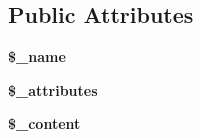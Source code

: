 \subsection*{Public Attributes}
\begin{DoxyCompactItemize}
\item 
\hypertarget{class_simple_tag_a0d4cced3e66eec94d947e469b983e2b8}{
{\bfseries \$\_\-name}}
\label{class_simple_tag_a0d4cced3e66eec94d947e469b983e2b8}

\item 
\hypertarget{class_simple_tag_a6d018439bca77734bd94de2583aca71b}{
{\bfseries \$\_\-attributes}}
\label{class_simple_tag_a6d018439bca77734bd94de2583aca71b}

\item 
\hypertarget{class_simple_tag_ae0bf7dceb35f541b58046dc0f5119e86}{
{\bfseries \$\_\-content}}
\label{class_simple_tag_ae0bf7dceb35f541b58046dc0f5119e86}

\end{DoxyCompactItemize}


